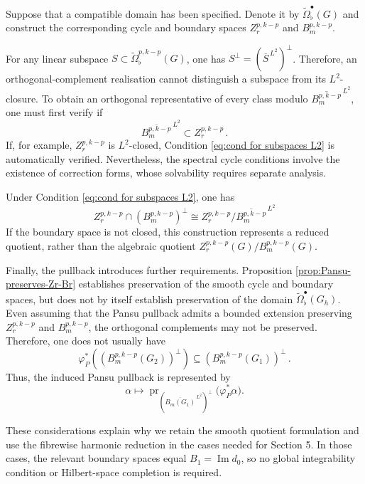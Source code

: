 \documentclass[dvipsnames]{amsart}
\theoremstyle{definition}
\theoremstyle{definition}
\numberwithin{equation}{section}
\begin{document}
Suppose that a compatible domain has been specified. Denote it by $\widetilde{\Omega}^\bullet_{\flat}(G)$ and construct the corresponding cycle and boundary spaces $Z_r^{p,k-p}$ and $B_m^{p,k-p}$.

For any linear subspace $S \subset \widetilde{\Omega}_{\flat}^{p,k-p}(G)$, one has $
S^\perp=(\overline S^{\,L^2})^\perp
$. Therefore, an orthogonal-complement realisation cannot distinguish
a subspace from its $L^2$-closure.
To obtain an orthogonal representative of every class modulo $\overline{B_m^{p,k-p}}^{\,L^2}$, one must first verify if
\begin{equation}\label{eq:cond for subspaces L2}
    \overline{B_m^{p,k-p}}^{\,L^2} \subset Z_r^{p,k-p}\,.
\end{equation}
If, for example, $Z_r^{p,k-p}$ is $L^2$-closed, Condition \eqref{eq:cond for subspaces L2} is automatically verified. Nevertheless, the spectral cycle conditions involve the existence of correction forms, whose solvability requires separate analysis.

Under Condition \eqref{eq:cond for subspaces L2}, one has
\begin{equation*}
    Z_r^{p,k-p}
\cap
\left(B_m^{p,k-p}\right)^\perp \cong Z_r^{p,k-p}/
\overline{B_m^{p,k-p}}^{\,L^2}
\end{equation*}
If the boundary space is not closed, this construction represents a reduced quotient, rather than the algebraic quotient \(Z_r^{p,k-p}(G)/B_m^{p,k-p}(G)\).


Finally, the pullback introduces further requirements. Proposition \ref{prop:Pansu-preserves-Zr-Br} establishes preservation of the smooth cycle and boundary spaces, but does not by itself establish preservation of the domain $\widetilde{\Omega}^\bullet_{\flat}(G_h)$.
Even assuming that the Pansu pullback admits a bounded extension preserving $Z_r^{p,k-p}$ and $B_m^{p,k-p}$, the orthogonal
complements may not be preserved. Therefore, one
does not usually have
$$
\varphi_P^*
\left(
\left(B_m^{p,k-p}(G_2)\right)^\perp
\right)
\subseteq
\left(B_m^{p,k-p}(G_1)\right)^\perp\,.
$$
Thus, the induced Pansu pullback is represented by
$$
\alpha
\longmapsto
\operatorname{pr}_{(\overline{B_m(G_1)}^{\,L^2})^\perp}
\bigl(\varphi_P^*\alpha\bigr).
$$

These considerations explain why we retain the smooth quotient formulation and use the fibrewise harmonic reduction in the cases needed for Section 5. In those cases, the relevant boundary spaces equal $B_1=\operatorname{Im}d_0$, so no global integrability condition or Hilbert-space completion is required.
\end{document}
